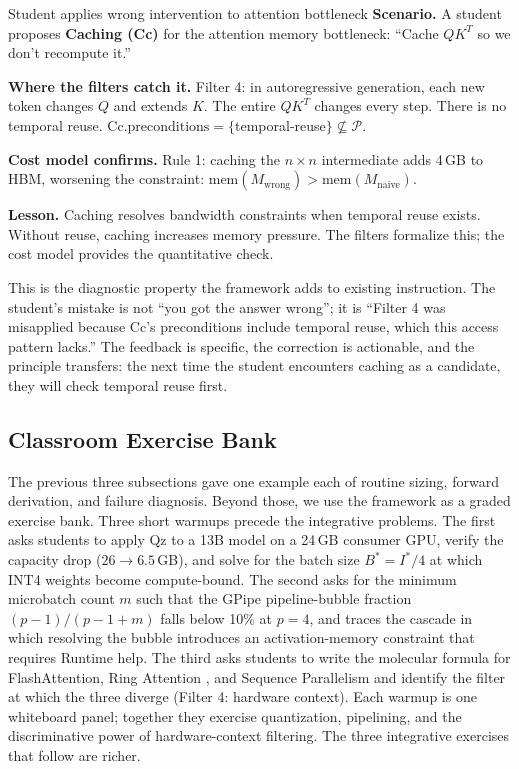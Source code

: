 \documentclass[10pt,twocolumn]{article}
\newcommand{\AttnTotalGB}{4}          %
\begin{document}
\begin{errorcase}{Student applies wrong intervention to attention bottleneck}
\textbf{Scenario.} A student proposes \textbf{Caching (Cc)} for the attention memory bottleneck: ``Cache $QK^T$ so we don't recompute it.''

\textbf{Where the filters catch it.} Filter 4: in autoregressive generation, each new token changes $Q$ and extends $K$. The entire $QK^T$ changes every step. There is no temporal reuse. $\text{Cc}.\text{preconditions} = \{$temporal-reuse$\} \not\subseteq \mathcal{P}$.

\textbf{Cost model confirms.} Rule 1: caching the $n \times n$ intermediate adds \AttnTotalGB{}\,GB to HBM, worsening the constraint: $\text{mem}(M_{\text{wrong}}) > \text{mem}(M_{\text{naive}})$.

\textbf{Lesson.} Caching resolves bandwidth constraints when temporal reuse exists. Without reuse, caching increases memory pressure. The filters formalize this; the cost model provides the quantitative check.
\end{errorcase}

This is the diagnostic property the framework adds to existing instruction. The student's mistake is not ``you got the answer wrong''; it is ``Filter 4 was misapplied because Cc's preconditions include temporal reuse, which this access pattern lacks.'' The feedback is specific, the correction is actionable, and the principle transfers: the next time the student encounters caching as a candidate, they will check temporal reuse first.

\subsection{Classroom Exercise Bank}
\label{sec:exercises}

The previous three subsections gave one example each of routine sizing, forward derivation, and failure diagnosis. Beyond those, we use the framework as a graded exercise bank. Three short warmups precede the integrative problems. The first asks students to apply Qz to a 13B model on a 24\,GB consumer GPU, verify the capacity drop ($26 \to 6.5$\,GB), and solve for the batch size $B^{*} = I^{*}/4$ at which INT4 weights become compute-bound. The second asks for the minimum microbatch count $m$ such that the GPipe pipeline-bubble fraction $(p-1)/(p-1+m)$ falls below 10\% at $p = 4$, and traces the cascade in which resolving the bubble introduces an activation-memory constraint that requires Runtime help. The third asks students to write the molecular formula for FlashAttention, Ring Attention \citep{liu2023ring}, and Sequence Parallelism \citep{korthikanti2023reducing} and identify the filter at which the three diverge (Filter 4: hardware context). Each warmup is one whiteboard panel; together they exercise quantization, pipelining, and the discriminative power of hardware-context filtering. The three integrative exercises that follow are richer.
\end{document}
